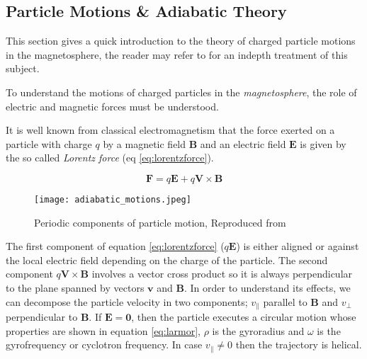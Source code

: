 \subsection{Particle Motions \& Adiabatic Theory} \label{sec:plasmadiff}

This section gives a quick introduction to the theory of charged particle motions in the magnetosphere, the reader 
may refer to \citet{roederer2012dynamics} for an indepth treatment of this subject.

To understand the motions of charged particles in the \emph{magnetosphere}, the role of electric and magnetic 
forces must be understood.

It is well known from classical electromagnetism that the force exerted on a particle with charge $q$ by a 
magnetic field $\textbf{B}$ and an electric field $\textbf{E}$ is given by the so called \emph{Lorentz force} 
(eq \ref{eq:lorentzforce}).

\begin{equation}\label{eq:lorentzforce}
    \textbf{F} = q\textbf{E} + q\textbf{V} \times \textbf{B}
\end{equation}

\begin{wrapfigure}{r}{0.4\textwidth}
    \centering\texttt{[image: adiabatic\_motions.jpeg]}
    \caption{
        \small{Periodic components of particle motion, Reproduced from \citet{roederer2012dynamics}}}
    \label{fig:particlemotions}
\end{wrapfigure}


The first component of equation \ref{eq:lorentzforce} ($q\textbf{E}$) is either aligned or against the local electric 
field depending on the charge of the particle. The second component $q\textbf{V} \times \textbf{B}$ involves a vector 
cross product so it is always perpendicular to the plane spanned by vectors $\textbf{v}$ and $\textbf{B}$. In order to 
understand its effects, we can decompose the particle velocity in two components; $v_{\parallel}$ parallel to $\textbf{B}$ and 
$v_{\perp}$ perpendicular to $\textbf{B}$. If $\textbf{E} = \mathbf{0}$, then the particle executes a circular motion 
whose properties are shown in equation \ref{eq:larmor}, $\rho$ is the gyroradius and $\omega$ is the gyrofrequency or 
cyclotron frequency. In case $v_{\parallel} \neq 0$ then the trajectory is helical.

